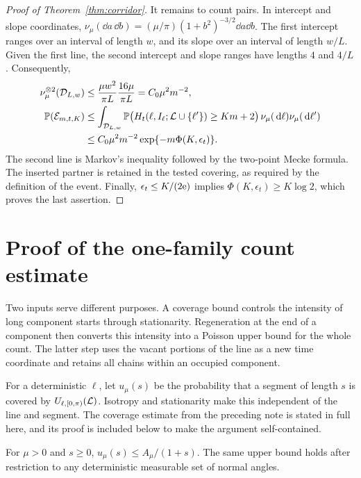 \documentclass[11pt,letterpaper]{article}
\begin{document}
\begin{proof}[Proof of Theorem~\ref{thm:corridor}]
It remains to count pairs. In intercept and slope coordinates, $\nu_\mu(\dd a\,\dd b)=(\mu/\pi)(1+b^2)^{-3/2}\dd a\dd b$. The first intercept ranges over an interval of length $w$, and its slope over an interval of length $w/L$. Given the first line, the second intercept and slope ranges have lengths $4$ and $4/L$. Consequently,
\begin{equation}\label{eq:mecke}
\begin{aligned}
 \nu_\mu^{\otimes2}(\mathcal D_{L,w})
   &\le\frac{\mu w^2}{\pi L}\frac{16\mu}{\pi L}
    =C_0\mu^2m^{-2},\\
 \mathbb P(\mathcal E_{m,t,K})
   &\le\int_{\mathcal D_{L,w}}
       \mathbb P\big(H_t(\ell,I_\ell;\mathcal L\cup\{\ell'\})\ge Km+2\big)
          \,\nu_\mu(\,\mathrm{d}\ell)\nu_\mu(\,\mathrm{d}\ell')\\
   &\le C_0\mu^2m^{-2}\exp\{-m\Phi(K,\epsilon_t)\}.
\end{aligned}
\end{equation}
The second line is Markov's inequality followed by the two-point Mecke formula. The inserted partner is retained in the tested covering, as required by the definition of the event. Finally, $\epsilon_t\le K/(2\mathrm{e})$ implies $\Phi(K,\epsilon_t)\ge K\log2$, which proves the last assertion.
\end{proof}

\section{Proof of the one-family count estimate}

Two inputs serve different purposes. A coverage bound controls the intensity of long component starts through stationarity. Regeneration at the end of a component then converts this intensity into a Poisson upper bound for the whole count. The latter step uses the vacant portions of the line as a new time coordinate and retains all chains within an occupied component.

For a deterministic $\ell$, let $u_\mu(s)$ be the probability that a segment of length $s$ is covered by $U_{\ell,[0,\pi)}(\mathcal L)$. Isotropy and stationarity make this independent of the line and segment. The coverage estimate from the preceding note is stated in full here, and its proof is included below to make the argument self-contained.

\begin{lemma}\label{lem:coverage}
For $\mu>0$ and $s\ge0$, $u_\mu(s)\le A_\mu/(1+s)$. The same upper bound holds after restriction to any deterministic measurable set of normal angles.
\end{lemma}
\end{document}

